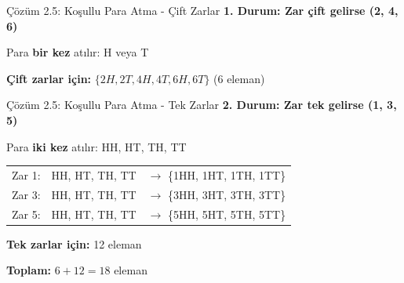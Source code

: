 \documentclass[light]{lutbeamer}
\begin{document}
\begin{frame}{Çözüm 2.5: Koşullu Para Atma - Çift Zarlar}
    \color{blue}
    \textbf{1. Durum: Zar çift gelirse (2, 4, 6)}
    
    Para \textbf{bir kez} atılır: H veya T
    
    \begin{center}
    \end{center}
    
    \textbf{Çift zarlar için:} $\{2H, 2T, 4H, 4T, 6H, 6T\}$ (6 eleman)
\end{frame}

\begin{frame}{Çözüm 2.5: Koşullu Para Atma - Tek Zarlar}
    \color{blue}
    \textbf{2. Durum: Zar tek gelirse (1, 3, 5)}
    
    Para \textbf{iki kez} atılır: HH, HT, TH, TT
    
    \footnotesize
    \begin{center}
    \begin{tabular}{ccl}
        Zar 1: & HH, HT, TH, TT & $\rightarrow$ \{1HH, 1HT, 1TH, 1TT\} \\
        Zar 3: & HH, HT, TH, TT & $\rightarrow$ \{3HH, 3HT, 3TH, 3TT\} \\
        Zar 5: & HH, HT, TH, TT & $\rightarrow$ \{5HH, 5HT, 5TH, 5TT\} \\
    \end{tabular}
    \end{center}
    
    \textbf{Tek zarlar için:} 12 eleman
    
    \vspace{0.5cm}
    \textbf{Toplam:} $6 + 12 = 18$ eleman
    
    \begin{center}
    \end{center}
\end{frame}
\end{document}
